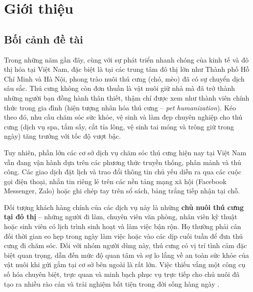 \section{Giới thiệu}

\subsection{Bối cảnh đề tài}
Trong những năm gần đây, cùng với sự phát triển nhanh chóng của kinh tế và đô thị hóa tại Việt Nam, đặc biệt là tại các trung tâm đô thị lớn như Thành phố Hồ Chí Minh và Hà Nội, phong trào nuôi thú cưng (chó, mèo) đã có sự chuyển dịch sâu sắc. Thú cưng không còn đơn thuần là vật nuôi giữ nhà mà đã trở thành những người bạn đồng hành thân thiết, thậm chí được xem như thành viên chính thức trong gia đình (hiện tượng nhân hóa thú cưng -- \textit{pet humanization}). Kéo theo đó, nhu cầu chăm sóc sức khỏe, vệ sinh và làm đẹp chuyên nghiệp cho thú cưng (dịch vụ spa, tắm sấy, cắt tỉa lông, vệ sinh tai móng và trông giữ trong ngày) tăng trưởng với tốc độ vượt bậc.

Tuy nhiên, phần lớn các cơ sở dịch vụ chăm sóc thú cưng hiện nay tại Việt Nam vẫn đang vận hành dựa trên các phương thức truyền thống, phân mảnh và thủ công. Các giao dịch đặt lịch và trao đổi thông tin chủ yếu diễn ra qua các cuộc gọi điện thoại, nhắn tin riêng lẻ trên các nền tảng mạng xã hội (Facebook Messenger, Zalo) hoặc ghi chép tay trên sổ sách, bảng trắng tiếp nhận tại chỗ. 

Đối tượng khách hàng chính của các dịch vụ này là những \textbf{chủ nuôi thú cưng tại đô thị} -- những người đi làm, chuyên viên văn phòng, nhân viên kỹ thuật hoặc sinh viên có lịch trình sinh hoạt và làm việc bận rộn. Họ thường phải cân đối thời gian eo hẹp trong ngày làm việc hoặc vào các dịp cuối tuần để đưa thú cưng đi chăm sóc. Đối với nhóm người dùng này, thú cưng có vị trí tình cảm đặc biệt quan trọng, dẫn đến mức độ quan tâm và sự lo lắng về an toàn sức khỏe của vật nuôi khi gửi gắm tại cơ sở bên ngoài là rất lớn. Việc thiếu vắng một công cụ số hóa chuyên biệt, trực quan và minh bạch phục vụ trực tiếp cho chủ nuôi đã tạo ra nhiều rào cản và trải nghiệm bất tiện trong đời sống hàng ngày \cite{sharp2019interaction, dinhdien2006nlp}.

